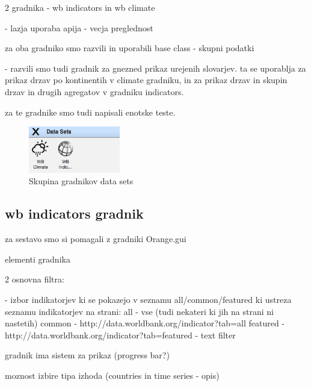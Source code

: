 2 gradnika - wb indicators in wb climate

- lazja uporaba apija
- vecja preglednost


za oba gradniko smo razvili in uporabili base class - skupni podatki

- razvili smo tudi gradnik za gnezned prikaz urejenih slovarjev.
  ta se uporablja za prikaz drzav po kontinentih v climate gradniku,
  in za prikaz drzav in skupin drzav in drugih agregatov v gradniku
  indicators.


za te gradnike smo tudi napisali enotske teste.


\begin{figure}
  \begin{center}
    \includegraphics[width=4cm]{pic/data_sets_group.png}
  \end{center}
  \caption{Skupina gradnikov data sets}
  \label{drevo}
\end{figure} 


\subsection{wb indicators gradnik}

za sestavo smo si pomagali z gradniki Orange.gui 

elementi gradnika

2 osnovna filtra: 

- izbor indikatorjev ki se pokazejo v seznamu all/common/featured 
  ki ustreza seznamu indikatorjev na strani: 
  all - vse (tudi nekateri ki jih na strani ni nastetih)
  common - http://data.worldbank.org/indicator?tab=all
  featured - http://data.worldbank.org/indicator?tab=featured
- text filter

gradnik ima sistem za prikaz (progress bar?) 

moznost izbire tipa izhoda (countries in time series - opis)

